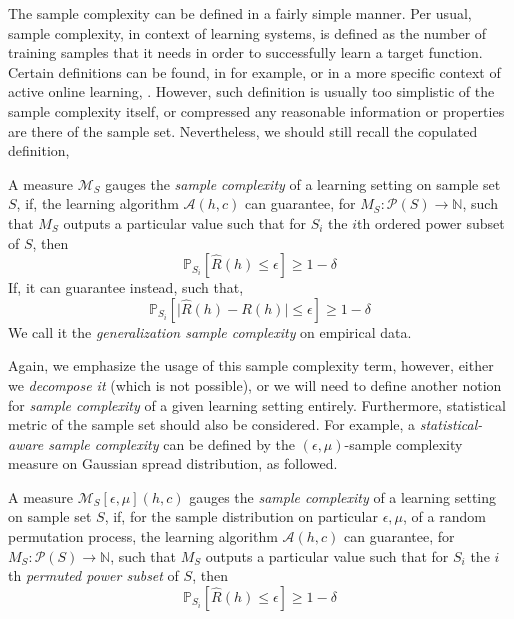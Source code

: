 \documentclass[10pt]{article}
\begin{document}
The sample complexity can be defined in a fairly simple manner. Per usual, sample complexity, in context of learning systems, is defined as the number of training samples that it needs in order to successfully learn a target function. Certain definitions can be found, in for example, \cite{huang2025samplecomplexityrepresentationability,wegel2025samplecomplexitysemisupervisedmultiobjective,Mei2022TowardsBridging} or in a more specific context of active online learning, \cite{Balcan2010TrueSampleComplexity}.  However, such definition is usually too simplistic of the sample complexity itself, or compressed any reasonable information or properties are there of the sample set. Nevertheless, we should still recall the copulated definition, 
\begin{definition}
  A measure $\mathcal{M}_{S}$ gauges the \textit{sample complexity} of a learning setting on sample set $S$, if, the learning algorithm $\mathcal{A}(h,c)$ can guarantee, for $M_{S}:\mathcal{P}(S)\to\mathbb{N}$, such that $M_{S}$ outputs a particular value such that for $S_{i}$ the $i$th ordered power subset of $S$, then
  \begin{equation}
    \mathbb{P}_{S_{i}} \left[\hat{R}(h)\leq \epsilon\right] \geq 1 - \delta
  \end{equation}
  If, it can guarantee instead, such that, 
  \begin{equation}
    \mathbb{P}_{S_{i}} \left[\lvert \hat{R}(h) - R(h) \rvert\leq \epsilon\right] \geq 1 - \delta
  \end{equation}
  We call it the \textit{generalization sample complexity} on empirical data. 
\end{definition}
Again, we emphasize the usage of this sample complexity term, however, either we \textit{decompose it} (which is not possible), or we will need to define another notion for \textit{sample complexity} of a given learning setting entirely. Furthermore, statistical metric of the sample set should also be considered. For example, a \textit{statistical-aware sample complexity} can be defined by the $(\epsilon,\mu)$-sample complexity measure on Gaussian spread distribution, as followed. 
\begin{definition}
  A measure $\mathcal{M}_{S}[\epsilon,\mu](h,c)$ gauges the \textit{sample complexity} of a learning setting on sample set $S$, if, for the sample distribution on particular $\epsilon,\mu$, of a random permutation process, the learning algorithm $\mathcal{A}(h,c)$ can guarantee, for $M_{S}:\mathcal{P}(S)\to\mathbb{N}$, such that $M_{S}$ outputs a particular value such that for $S_{i}$ the $i$th \textit{permuted power subset} of $S$, then
  \begin{equation}
    \mathbb{P}_{S_{i}} \left[\hat{R}(h)\leq \epsilon\right] \geq 1 - \delta
  \end{equation}
\end{definition}
\end{document}
